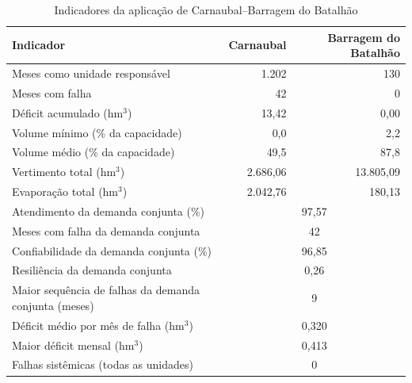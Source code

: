 \begin{table}[!htbp]
    \captionsetup{width=15cm}
    \caption{Indicadores da aplicação de Carnaubal--Barragem do Batalhão}
    \label{tab:carnaubal-indicadores}
    \centering
    \footnotesize
    \begin{tabular}{lrr}
        \toprule
        Indicador & Carnaubal & Barragem do Batalhão \\
        \midrule
        Meses como unidade responsável & 1.202 & 130 \\
        Meses com falha & 42 & 0 \\
        Déficit acumulado (hm$^3$) & 13,42 & 0,00 \\
        Volume mínimo (\% da capacidade) & 0,0 & 2,2 \\
        Volume médio (\% da capacidade) & 49,5 & 87,8 \\
        Vertimento total (hm$^3$) & 2.686,06 & 13.805,09 \\
        Evaporação total (hm$^3$) & 2.042,76 & 180,13 \\
        \midrule
        Atendimento da demanda conjunta (\%) & \multicolumn{2}{c}{97,57} \\
        Meses com falha da demanda conjunta & \multicolumn{2}{c}{42} \\
        Confiabilidade da demanda conjunta (\%) & \multicolumn{2}{c}{96,85} \\
        Resiliência da demanda conjunta & \multicolumn{2}{c}{0,26} \\
        Maior sequência de falhas da demanda conjunta (meses) & \multicolumn{2}{c}{9} \\
        Déficit médio por mês de falha (hm$^3$) & \multicolumn{2}{c}{0,320} \\
        Maior déficit mensal (hm$^3$) & \multicolumn{2}{c}{0,413} \\
        Falhas sistêmicas (todas as unidades) & \multicolumn{2}{c}{0} \\
        \bottomrule
    \end{tabular}
\end{table}

